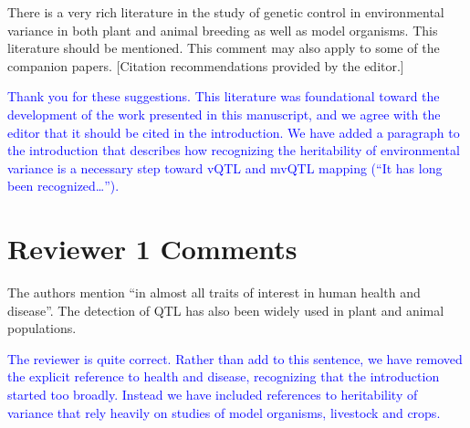 \documentclass[11pt]{article}
\newcommand{\ReviewerQuestion}[1]{
  \vspace{5pt}\goodbreak
  \noindent\fbox{Reviewer:} #1
  \normalfont\par
}
\newcommand{\EditorQuestion}[1]{
  \vspace{5pt}\goodbreak
  \noindent\fbox{Editor:} #1
  \normalfont\par
}
\newcommand{\Response}[1]{
  \goodbreak
  \textcolor{blue}{#1}
  \normalfont\par
}
\begin{document}
\EditorQuestion{
  There is a very rich literature in the study of genetic control in environmental variance in both plant and animal breeding as well as model organisms.
  This literature should be mentioned. This comment may also apply to some of the companion papers.
  [Citation recommendations provided by the editor.]
}
\Response{
  Thank you for these suggestions. 
  This literature was foundational toward the development of the work presented in this manuscript, and we agree with the editor that it should be cited in the introduction.
  We have added a paragraph to the introduction that describes how recognizing the heritability of environmental variance is a necessary step toward vQTL and mvQTL mapping (``It has long been recognized\dots'').
}







\section*{Reviewer 1 Comments}

\ReviewerQuestion{
  The authors mention ``in almost all traits of interest in human health and disease''.
  The detection of QTL has also been widely used in plant and animal populations.
}
\Response{
  The reviewer is quite correct. Rather than add to this sentence, we have removed the explicit reference to health and disease, recognizing that the introduction started too broadly. Instead we have included references to heritability of variance that rely heavily on studies of model organisms, livestock and crops.
}
\end{document}
